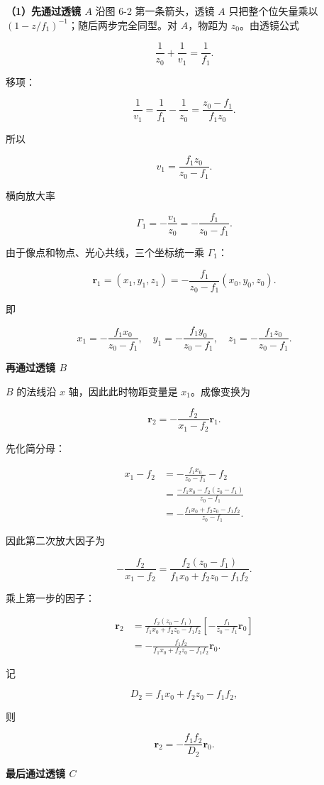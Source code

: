 \documentclass[12pt,a4paper,UTF8]{ctexart}
\begin{document}
\textbf{（1）先通过透镜 \(A\)} 沿图 6-2 第一条箭头，透镜 \(A\)
只把整个位矢量乘以 \((1-z/f_1)^{-1}\)；随后两步完全同型。对
\(A\)，物距为 \(z_0\)。由透镜公式

\[\frac1{z_0}+\frac1{v_1}=\frac1{f_1}.\]

移项：

\[\frac1{v_1}=\frac1{f_1}-\frac1{z_0}
=\frac{z_0-f_1}{f_1z_0}.\]

所以

\[v_1=\frac{f_1z_0}{z_0-f_1}.\]

横向放大率

\[\Gamma_1=-\frac{v_1}{z_0}=-\frac{f_1}{z_0-f_1}.\]

由于像点和物点、光心共线，三个坐标统一乘 \(\Gamma_1\)：

\[\boxed{
\bm r_1=(x_1,y_1,z_1)
=-\frac{f_1}{z_0-f_1}(x_0,y_0,z_0)
}.\]

即

\[x_1=-\frac{f_1x_0}{z_0-f_1},\quad
y_1=-\frac{f_1y_0}{z_0-f_1},\quad
z_1=-\frac{f_1z_0}{z_0-f_1}.\]

\textbf{再通过透镜 \(B\)}

\(B\) 的法线沿 \(x\) 轴，因此此时物距变量是 \(x_1\)。成像变换为

\[\bm r_2=-\frac{f_2}{x_1-f_2}\bm r_1.\]

先化简分母：

\[\begin{aligned}
x_1-f_2
&=-\frac{f_1x_0}{z_0-f_1}-f_2\\
&=\frac{-f_1x_0-f_2(z_0-f_1)}{z_0-f_1}\\
&=-\frac{f_1x_0+f_2z_0-f_1f_2}{z_0-f_1}.
\end{aligned}\]

因此第二次放大因子为

\[-\frac{f_2}{x_1-f_2}
=\frac{f_2(z_0-f_1)}{f_1x_0+f_2z_0-f_1f_2}.\]

乘上第一步的因子：

\[\begin{aligned}
\bm r_2
&=\frac{f_2(z_0-f_1)}{f_1x_0+f_2z_0-f_1f_2}
\left[-\frac{f_1}{z_0-f_1}\bm r_0\right]\\
&=-\frac{f_1f_2}{f_1x_0+f_2z_0-f_1f_2}\bm r_0.
\end{aligned}\]

记

\[D_2=f_1x_0+f_2z_0-f_1f_2,\]

则

\[\bm r_2=-\frac{f_1f_2}{D_2}\bm r_0.\]

\textbf{最后通过透镜 \(C\)}
\end{document}

